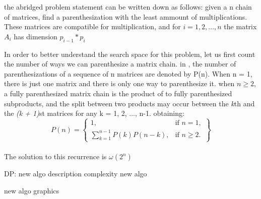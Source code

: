 the abridged problem statement can be written down as follows: given a n chain of matrices,
find a parenthesization with the least ammount of multiplications. These matrices are compatible
for multiplication, and for $i = 1, 2, ..., n$ the matrix $A_i$ has dimension $p_{i-1} * p_i$


In order to better understand the search space for this problem, let us first count the number
of ways we can parenthesize a matrix chain. in \cite{cormen2009introduction}, the number of
parenthesizations of a sequence of n matrices are denoted by P(n). When n = 1, there is just one matrix and there is only
one way to parenthesize it. when $n \geq 2$, a fully parenthesized matrix chain is the product of to 
fully parenthesized subproducts, and the split between two products may occur between the \emph{k}th and the
\emph{(k + 1)}st matrices for any k = 1, 2, ..., n-1. obtaining:
  \\
  \[
    P(n) = \left\{\begin{array}{lr}
      1, & \text{if } n = 1,\\
      \sum_{k=1}^{n-1}P(k)P(n-k), & \text{if } n \geq 2.
      \end{array}\right\}
  \]
  \\


The solution to this recurrence is $\omega (2^n)$ 

DP:
new algo description
complexity new algo


new algo graphics